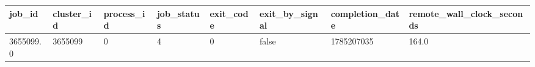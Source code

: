 \begin{tabular}{llllllll}
\toprule
job\_id & cluster\_id & process\_id & job\_status & exit\_code & exit\_by\_signal & completion\_date & remote\_wall\_clock\_seconds \\
\midrule
3655099.0 & 3655099 & 0 & 4 & 0 & false & 1785207035 & 164.0 \\
\bottomrule
\end{tabular}

